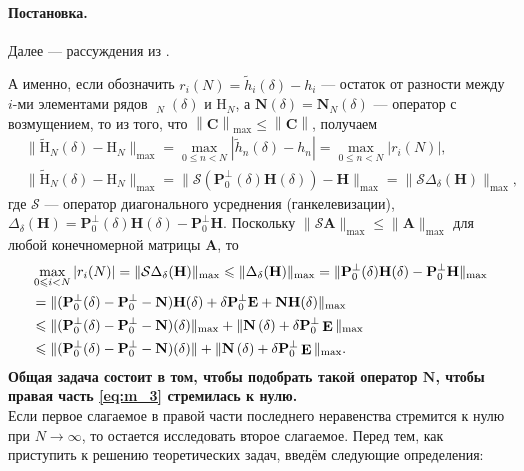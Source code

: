\documentclass[specialist,
substylefile = spbu_report.rtx,
subf,href,colorlinks=true, 12pt]{disser}
\newcommand\norm[1]{\left\|#1\right\|}
\let\H\relax
\DeclareMathOperator\H{\mathbf{H}}
\DeclareMathOperator\E{\mathbf{E}}
\DeclareMathOperator\tildeH{\widetilde{\mathrm{H}}}
\newenvironment{statement}{\paragraph{Постановка.}}{\hfill}
\begin{document}
\begin{statement}
		Далее --- рассуждения из \cite[раздел 5.3]{Nekrutkin10}.
		
		А именно, если обозначить $r_i(N)=\widetilde{h}_i(\delta)-h_i$ --- остаток от разности между $i$-ми элементами рядов $\tildeH_N(\delta)\text{ и }\mathrm{H}_N$, а $\mathbf{N}(\delta) = \mathbf{N}_N(\delta)$ --- оператор с возмущением, то из того, что  $\norm{\mathbf{C}}_{\max}\leqslant \norm{\mathbf{C}}$, получаем
		\begin{align*}
			&\|\widetilde{\mathrm{H}}_{N}(\delta) - \mathrm{H}_N\|_{\max} = \max_{0\leqslant n<N}|\widetilde{h}_n(\delta) - h_n| = \max_{0\leqslant n < N}|r_i(N)|,\\
			&\|\widetilde{\mathrm{H}}_{N}(\delta) - \mathrm{H}_N\|_{\max} = \|\mathcal{S}(\mathbf{P}_0^{\bot}(\delta)\mathbf{H}(\delta)) - \mathbf{H}\|_{\max} = \|\mathcal{S}\Delta_\delta(\mathbf{H})\|_{\max},
		\end{align*}
		где $\mathcal{S}$ --- оператор диагонального усреднения (ганкелевизации), $\Delta_\delta(\mathbf{H}) = \mathbf{P}_0^\bot(\delta)\mathbf{H}(\delta) - \mathbf{P}_0^\bot\mathbf{H}$. Поскольку $\|\mathcal{S}\mathbf{A}\|_{\max}\leqslant\|\mathbf{A}\|_{\max}$ для любой конечномерной матрицы $\mathbf{A}$, то
		\begin{align}
			&\max_{0\leqslant i<N} |r_i(N)| = \|\mathcal{S}\Delta_\delta(\mathbf{H})\|_{\max} \leqslant\|\Delta_\delta(\mathbf{H})\|_{\max}=\|\mathbf{P}_0^\bot(\delta)\mathbf{H}(\delta) - \mathbf{P}_0^\bot\mathbf{H}\|_{\max}\nonumber
			\\ 
			&=\|(\mathbf{P}_0^\bot(\delta) - \mathbf{P}_0^\bot-\mathbf{N})\mathbf{H}(\delta) + \delta\mathbf{P}_0^\bot\mathbf{E} + \mathbf{N}\mathbf{H}(\delta) \|_{\max}\nonumber
			\\
			&\leqslant\|(\mathbf{P}_0^\bot(\delta)- \mathbf{P}_0^\bot-\mathbf{N})\H(\delta)\|_{\max} + \| \mathbf{N}\, \H(\delta) + \delta \mathbf{P}_0^\perp \E\|_{\max}\nonumber
			\\
			&\leqslant\|(\mathbf{P}_0^\bot(\delta)- \mathbf{P}_0^\bot-\mathbf{N})\H(\delta)\| + \| \mathbf{N}\, \H(\delta) + \delta \mathbf{P}_0^\perp \E\|_{\max}.\label{eq:m_3}
		\end{align}
		{\bf Общая задача состоит в том, чтобы подобрать такой оператор $\mathbf{N}$, чтобы правая часть \eqref{eq:m_3} стремилась к нулю.}
	\end{statement}\\
	Если первое слагаемое в правой части последнего неравенства  стремится к нулю при $N \rightarrow \infty$, то остается исследовать второе слагаемое. Перед тем, как приступить к решению теоретических задач, введём следующие определения:
\end{document}
